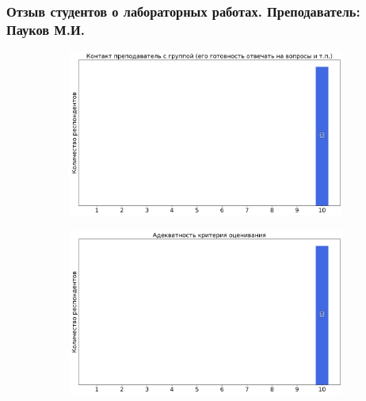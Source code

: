 	\subsubsection{Отзыв студентов о лабораторных работах. Преподаватель: Пауков М.И.}
		\begin{figure}[H]
			\centering
			\begin{subfigure}[b]{0.45\textwidth}
				\centering
				\includegraphics[width=\textwidth]{images/2 course/Общая физика - электричество и магнетизм/labniks-marks-Пауков М.И.-0.png}
			\end{subfigure}
			\begin{subfigure}[b]{0.45\textwidth}
				\centering
				\includegraphics[width=\textwidth]{images/2 course/Общая физика - электричество и магнетизм/labniks-marks-Пауков М.И.-1.png}
			\end{subfigure}
			\begin{subfigure}[b]{0.45\textwidth}
				\centering

\end{subfigure}
\end{figure}
